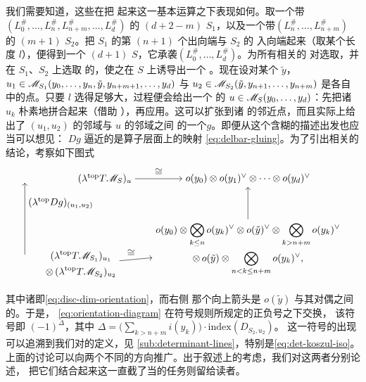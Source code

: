 我们需要知道，这些\trOrientation{}在把\trInhomogeneous\trPseudoholomorphicMap{}
\trGluing{}起来这一基本运算之下表现如何。取一个带\trBrane\trLabel{}
$(L^{\#}_0,\ldots,L^{\#}_n,L^{\#}_{n+m},\ldots,L^{\#}_d)$ 的 $(d{+}2{-}m)$
\trPointedDisc{}$S_1$，以及一个带\trLabel{}$(L^{\#}_n,\ldots,L^{\#}_{n+m})$ 的
$(m{+}1)$ \trPointedDisc{}$S_2$。把 $S_1$ 的第 $(n{+}1)$ 个出向端与 $S_2$ 的
入向端\trGluing{}起来（取某个\trGluing{}长度 $l$），便得到一个 $(d{+}1)$
\trPointedDisc{}$S$，它承袭\trLabel{}$(L^{\#}_0,\ldots,L^{\#}_d)$。为所有相关的%
\trLagrange\trSubmanifold{}对选取\trFloerDatum，并在 $S_1$、$S_2$ 上选取%
\trCompatible{}的\trPerturbationDatum，使之在 $S$ 上诱导出一个%
\trPerturbationDatum。现在设对某个 $\tilde{y}$，
$u_1\in\mathscr{M}_{S_1}(y_0,\ldots,y_n,\tilde{y},y_{n+m+1},\ldots,y_d)$ 与
$u_2\in\mathscr{M}_{S_2}(\tilde{y},y_{n+1},\ldots,y_{n+m})$ 是各自\trModuliSpace{}
中的\trRegular{}点。只要 $l$ 选得足够大，\trGluing{}过程便会给出一个\trRegular{}
的 $u\in\mathscr{M}_S(y_0,\ldots,y_d)$：先把诸 $u_k$ 朴素地拼合起来（借助%
\trPartitionOfUnity），再应用\trImplicitFunctionTheorem。这可以扩张到诸%
\trModuliSpace{}的邻近点，而且实际上给出了 $(u_1,u_2)$ 的邻域与 $u$ 的邻域之间
的一个\trLocalDiffeomorphism{}$g$。即便从这个含糊的描述出发也应当可以想见：
\trDifferential{}$Dg$ 逼近的是\trLinearization{}算子层面上的映射
\eqref{eq:delbar-gluing}。为了引出相关的结论，考察如下图式
\begin{equation}\label{eq:orientation-diagram}
\begin{tikzpicture}[line cap=round,line join=round]
\node (A) at (0.1,3.4) {$(\lambda^{\mathrm{top}}T\scr{M}_S)_u$};
\node (B) at (5.2,3.4)
 {$o(y_0)\otimes o(y_1)^{\vee}\otimes\cdots\otimes o(y_d)^{\vee}$};
\node (C) at (5.2,0.9) {$\displaystyle\begin{gathered}
o(y_0)\otimes\bigotimes_{k\le n}o(y_k)^{\vee}\otimes o(\tilde{y})^{\vee}
\otimes\bigotimes_{k>n+m}o(y_k)^{\vee}\\
\otimes\,o(\tilde{y})\otimes\bigotimes_{n<k\le n+m}o(y_k)^{\vee},\end{gathered}$};
\node (D) at (-0.75,0.35) {$\displaystyle\begin{gathered}
(\lambda^{\mathrm{top}}T\scr{M}_{S_1})_{u_1}\\
\otimes\,(\lambda^{\mathrm{top}}T\scr{M}_{S_2})_{u_2}\end{gathered}$};
\draw[->] (A) -- (B) node[midway,above]{$\cong$};
\draw[->] (C.north) -- (B.south);
\draw[->] (D) -- (C) node[pos=0.35,above]{$\cong$};
\draw[->] (-2.75,0.7) -- (-2.75,3.25)
 node[pos=0.72,right]{$(\lambda^{\mathrm{top}}Dg)_{(u_1,u_2)}$};
\end{tikzpicture}
\end{equation}
其中诸\trHorizontal\trIsomorphism{}即\eqref{eq:disc-dim-orientation}，而右侧
那个向上箭头是 $o(\tilde{y})$ 与其对偶之间的\trCanonical\trPairing。于是，
\eqref{eq:orientation-diagram} 在\trKoszul{}符号规则所规定的正负号之下交换，
该符号即 $(-1)^{\Delta}$，其中
$\Delta=\bigl(\sum_{k>n+m}i(y_k)\bigr)\cdot\mathrm{index}(D_{S_2,u_2})$。
这一符号的出现可以追溯到我们对\trDeterminantLine{}的定义，见
\cref{sub:determinant-lines}，特别是\eqref{eq:det-koszul-iso}。
上面的讨论可以向两个不同的方向推广。出于叙述上的考虑，我们对这两者分别论述，
把它们结合起来这一直截了当的任务则留给读者。
